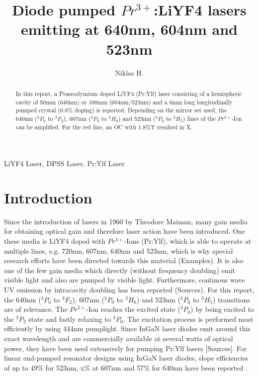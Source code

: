 \documentclass[conference]{IEEEtran}
\begin{document}
\title{Diode pumped $Pr^{3+}$:LiYF4 lasers emitting at 640nm, 604nm and 523nm\\
}

\author{Niklas H.}

\maketitle

\begin{abstract}
In this report, a Praseodymium doped LiYF4 (Pr:Ylf) laser consisting of a hemispheric cavity of 50mm (640nm) or 100mm (604nm/523nm) and a 6mm long longitudinally pumped crystal (0.8\% doping) is reported. Depending on the mirror set used, the 640nm ($^3P_0$ to $^3F_2$), 607nm ($^3P_0$ to $^3H_6$) and 523nm ($^3P_0$ to $^3H_5$) lines of the $Pr^{3+}$-Ion can be amplified. For the red line, an OC with 1.8\%T resulted in X.
\end{abstract}

\begin{IEEEkeywords}
LiYF4 Laser, DPSS Laser, Pr:Ylf Laser
\end{IEEEkeywords}
\section{Introduction}

Since the introduction of lasers in 1960 by Theodore Maiman, many gain media for obtaining optical gain and therefore laser action have been introduced. One these media is LiYF4 doped with $Pr^{3+}$-Ions (Pr:Ylf), which is able to operate at multiple lines, e.g. 720nm, 607nm, 640nm and 523nm, which is why special research efforts have been directed towards this material (Examples). It is also one of the few gain media which directly (without frequency doubling) emit visible light and also are pumped by visible light. Furthermore, continous wave UV emission by intracavity doubling has been reported (Sources). For this report, the 640nm ($^3P_0$ to $^3F_2$), 607nm ($^3P_0$ to $^3H_6$) and 523nm ($^3P_0$ to $^3H_5$) transitions are of relevance. The $Pr^{3+}$-Ion reaches the excited state ($^3P_0$) by being excited to the $^3P_2$ state and fastly relaxing to $^3P_0$. The excitation process is performed most efficiently by using 444nm pumplight. Since InGaN laser diodes emit around this exact wavelength and are commercially available at several watts of optical power, they have been used extensively for pumping Pr:Ylf lasers [Sources]. For linear end-pumped resonator designs using InGaN laser diodes, slope efficiencies of up to 49\% for 523nm, x\% at 607nm and 57\% for 640nm have been reported \cite{Luo.2016}. 
\end{document}
